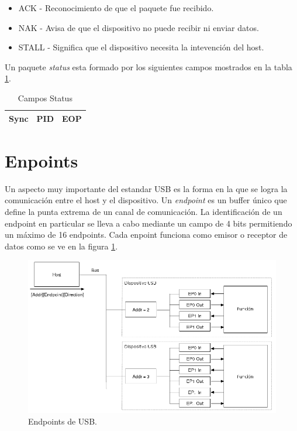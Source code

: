 \begin{itemize}
 \item ACK - Reconocimiento de que el paquete fue recibido.
 \item NAK - Avisa de que el dispositivo no puede recibir ni enviar datos.
 \item STALL - Significa que el dispositivo necesita la intevenci\'on del host.
\end{itemize}

Un paquete \emph{status} esta formado por los siguientes campos mostrados en la
tabla \ref{tab:usb_status_fields}.

\begin{table}[ht]
\centering
\begin{tabular}{|c|c|c|} \hline
Sync & PID & EOP\\ \hline
\end{tabular}
\caption{Campos Status} 
\label{tab:usb_status_fields}
\end{table}


\clearpage
\section{Enpoints}\label{cap:usb_endpoints}
Un aspecto muy importante del estandar USB es la forma en la que se logra la
comunicaci\'on entre el host y el dispositivo.
Un \emph{endpoint} es un buffer \'unico que define la punta extrema de un
canal de comunicaci\'on. La identificaci\'on de un endpoint en particular se
lleva a cabo mediante un campo de 4 bits permitiendo un m\'aximo de 16
endpoints. Cada enpoint funciona como emisor o receptor de datos como se ve en
la figura \ref{fig:usb_endpoints}.

\begin{figure}[htp]
\centering
\includegraphics[scale=0.5]{./img/usb_endpoints.png}
\caption{Endpoints de USB.}
\label{fig:usb_endpoints}
\end{figure}

